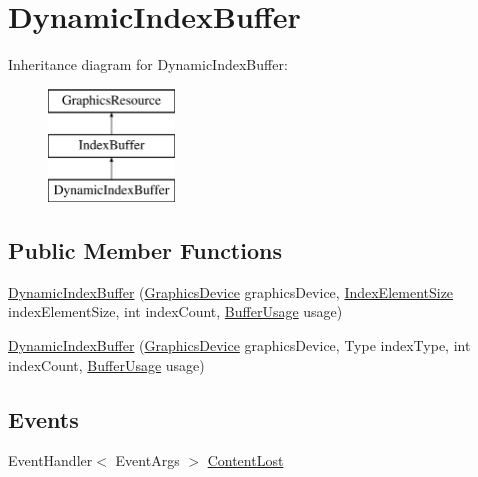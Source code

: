 \hypertarget{classMicrosoft_1_1Xna_1_1Framework_1_1Graphics_1_1DynamicIndexBuffer}{}\section{Dynamic\+Index\+Buffer}
\label{classMicrosoft_1_1Xna_1_1Framework_1_1Graphics_1_1DynamicIndexBuffer}
Inheritance diagram for Dynamic\+Index\+Buffer\+:\begin{figure}[H]
\begin{center}
\leavevmode
\includegraphics[height=3.000000cm]{classMicrosoft_1_1Xna_1_1Framework_1_1Graphics_1_1DynamicIndexBuffer}
\end{center}
\end{figure}
\subsection*{Public Member Functions}
\begin{DoxyCompactItemize}
\item 
\hyperlink{classMicrosoft_1_1Xna_1_1Framework_1_1Graphics_1_1DynamicIndexBuffer_a9d3bb03608d638f149ec9ee825bb2c7c}{Dynamic\+Index\+Buffer} (\hyperlink{classMicrosoft_1_1Xna_1_1Framework_1_1Graphics_1_1GraphicsDevice}{Graphics\+Device} graphics\+Device, \hyperlink{namespaceMicrosoft_1_1Xna_1_1Framework_1_1Graphics_a68811a9bcc2692a166d885d28313dea2}{Index\+Element\+Size} index\+Element\+Size, int index\+Count, \hyperlink{namespaceMicrosoft_1_1Xna_1_1Framework_1_1Graphics_a0d5d6ef0596e2ad7cfbd2b74cc19d3c2}{Buffer\+Usage} usage)
\item 
\hyperlink{classMicrosoft_1_1Xna_1_1Framework_1_1Graphics_1_1DynamicIndexBuffer_af25e24b5331270aee2d17625eb5efdf4}{Dynamic\+Index\+Buffer} (\hyperlink{classMicrosoft_1_1Xna_1_1Framework_1_1Graphics_1_1GraphicsDevice}{Graphics\+Device} graphics\+Device, Type index\+Type, int index\+Count, \hyperlink{namespaceMicrosoft_1_1Xna_1_1Framework_1_1Graphics_a0d5d6ef0596e2ad7cfbd2b74cc19d3c2}{Buffer\+Usage} usage)
\end{DoxyCompactItemize}
\subsection*{Events}
\begin{DoxyCompactItemize}
\item 
Event\+Handler$<$ Event\+Args $>$ \hyperlink{classMicrosoft_1_1Xna_1_1Framework_1_1Graphics_1_1DynamicIndexBuffer_a500518294be3cdbe63254f24ccd88c41}{Content\+Lost}
\end{DoxyCompactItemize}
